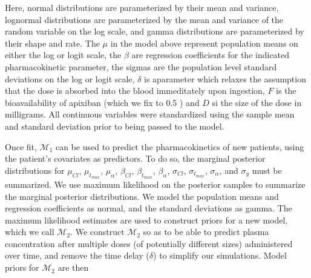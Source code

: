 Here, normal distributions are parameterized by their mean and variance, lognormal distributions are parameterized by the mean and variance of the random variable on the log scale, and gamma distributions are parameterized by their shape and rate.  The $\mu$ in the model above represent population means on either the log or logit scale, the $\beta$ are regression coefficients for the indicated pharmacokinetic parameter, the sigmas are the population level standard deviations on the log or logit scale, $\delta$ is aparameter which relaxes the assumption that the dose is absorbed into the blood immeditately upon ingestion, $F$ is the bioavailability of apixiban (which we fix to 0.5 \cite{byon2019apixaban}) and $D$ si the size of the dose in milligrams.  All continuous variables were standardized using the sample mean and standard deviation prior to being passed to the model.  

Once fit, $ \mathcal{M}_1$ can be used to predict the pharmacokinetics of new patients, using the patient’s covariates as predictors.  To do so, the marginal posterior distributions for $ \mu_{Cl} $, $ \mu_{t_{max}} $, $ \mu_{\alpha}$, $ \beta_{Cl} $, $ \beta_{t_{max}} $, $ \beta_{\alpha} $, $ \sigma_{Cl} $, $ \sigma_{t_{max}} $, $ \sigma_{\alpha} $, and $ \sigma_y $ must be summarized.  We use maximum likelihood on the posterior samples to summarize the marginal posterior distributions. We model the population means  and regression coefficients as normal, and the standard deviations  as gamma.  The maximum likelihood estimates are used to construct priors for a new model, which we call $ \mathcal{M}_2 $. We construct $ \mathcal{M}_2 $ so as to be able to predict plasma concentration after multiple doses (of potentially different sizes) administered over time, and remove the time delay ($ \delta $) to simplify our simulations.  Model priors for $ \mathcal{M}_2 $ are then 

